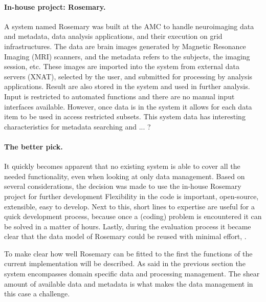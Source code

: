 \paragraph{In-house project: Rosemary.}
A system named Rosemary was built at the AMC to handle neuroimaging data and metadata, data analysis applications, and their execution on grid infrastructures.
The data are brain images generated by Magnetic Resonance Imaging (MRI) scanners, and the 
metadata refers to the subjects, the imaging session, etc. 
These images are imported into the system from external data servers (XNAT\cite{}), selected by the user, and submitted for processing by analysis applications. Result are also stored in the system and used in further analysis.
Input is restricted to automated functions and there are no manual input interfaces available.
However, once data is in the system it allows for each data item to be used in access restricted subsets.
This system data has interesting characteristics for metadata searching and ... ?

\paragraph{The better pick.}
It quickly becomes apparent that no existing system is able to cover all the needed functionality, even when looking at only data management. 
Based on several considerations, the decision was made to use the in-house Rosemary project for further development
Flexibility in the code is important, \ie{} open-source, extensible, easy to develop. 
Next to this, short lines to expertise are useful for a quick development process, because once a (coding) problem is encountered it can be solved in a matter of hours.
Lastly, during the evaluation process it became clear that the data model of Rosemary could be reused with minimal effort, .


To make clear how well Rosemary can be fitted to the \project{} first the functions of the current implementation will be described.
As said in the previous section the system encompasses domain specific data and processing management. 
The shear amount of available data and metadata is what makes the data management in this case a challenge.

